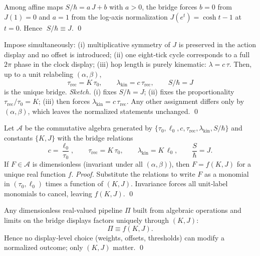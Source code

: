 \documentclass[11pt]{article}
\begin{document}
\begin{proposition}
Among affine maps $S/\hbar=a\,J+b$ with $a>0$, the bridge forces $b=0$ from $J(1)=0$ and $a=1$ from the log‑axis normalization $J(e^{t})=\cosh t-1$ at $t=0$. Hence $\;S/\hbar\equiv J$. \qed
\end{proposition}

\begin{proposition}
Impose simultaneously: (i) multiplicative symmetry of $J$ is preserved in the action display and no offset is introduced; (ii) one eight‑tick cycle corresponds to a full $2\pi$ phase in the clock display; (iii) hop length is purely kinematic: $\lambda=c\,\tau$. Then, up to a unit relabeling $(\alpha,\beta)$,
\[
\tau_{\mathrm{rec}}=K\,\tau_{0},\qquad \lambda_{\mathrm{kin}}=c\,\tau_{\mathrm{rec}},\qquad S/\hbar=J
\]
is the unique bridge. \emph{Sketch.} (i) fixes $S/\hbar=J$; (ii) fixes the proportionality $\tau_{\mathrm{rec}}/ \tau_{0}=K$; (iii) then forces $\lambda_{\mathrm{kin}}=c\,\tau_{\mathrm{rec}}$. Any other assignment differs only by $(\alpha,\beta)$, which leaves the normalized statements unchanged. \qed  %

\begin{lemma}
Let $\mathcal{A}$ be the commutative algebra generated by $\{\tau_{0},\ell_{0},c,\tau_{\mathrm{rec}},\lambda_{\mathrm{kin}},S/\hbar\}$ and constants $\{K,J\}$ with the bridge relations
\[
c=\frac{\ell_{0}}{\tau_{0}},\qquad \tau_{\mathrm{rec}}=K\,\tau_{0},\qquad
\lambda_{\mathrm{kin}}=K\,\ell_{0},\qquad \frac{S}{\hbar}=J.
\]
If $F\in\mathcal{A}$ is dimensionless (invariant under all $(\alpha,\beta)$), then $F=f(K,J)$ for a unique real function $f$. \emph{Proof.} Substitute the relations to write $F$ as a monomial in $(\tau_{0},\ell_{0})$ times a function of $(K,J)$. Invariance forces all unit‑label monomials to cancel, leaving $f(K,J)$. \qed
\end{lemma}

\begin{theorem}
Any dimensionless real‑valued pipeline $\Pi$ built from algebraic operations and limits on the bridge displays factors uniquely through $(K,J)$:
\[
\Pi \equiv f\!\left(K,J\right).
\]
Hence no display‑level choice (weights, offsets, thresholds) can modify a normalized outcome; only $(K,J)$ matter. \qed  %
\end{theorem}


\end{proposition}
\end{document}
